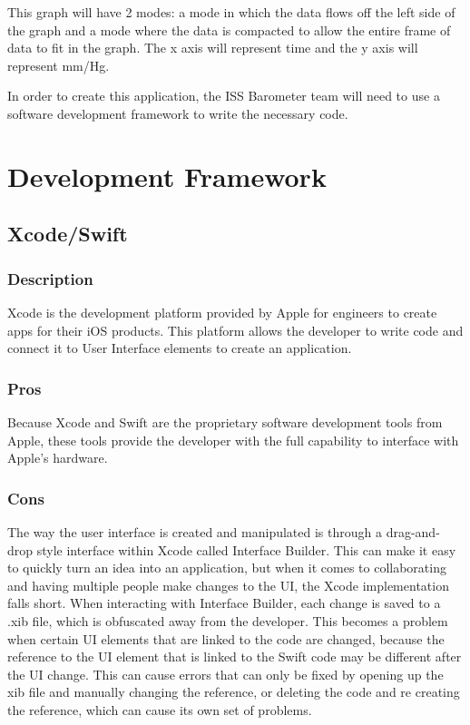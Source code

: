 \documentclass[onecolumn, draftclsnofoot,10pt, compsoc]{IEEEtran}
\begin{document}
This graph will have 2 modes: a mode in which the data flows off the left side of the graph and a mode where the data is compacted to allow the entire frame of data to fit in the graph. The x axis will represent time and the y axis will represent mm/Hg.

In order to create this application, the ISS Barometer team will need to use a software development framework to write the necessary code.

\section{Development Framework}

\subsection{Xcode/Swift}
\subsubsection*{Description}
Xcode is the development platform provided by Apple for engineers to create apps for their iOS products.
This platform allows the developer to write code and connect it to User Interface elements to create an application.

\subsubsection*{Pros}
Because Xcode and Swift are the proprietary software development tools from Apple, these tools provide the developer with the full capability to interface with Apple's hardware.

\subsubsection*{Cons}
The way the user interface is created and manipulated is through a drag-and-drop style interface within Xcode called Interface Builder.
This can make it easy to quickly turn an idea into an application, but when it comes to collaborating and having multiple people make changes to the UI, the Xcode implementation falls short.
When interacting with Interface Builder, each change is saved to a .xib file, which is obfuscated away from the developer.
This becomes a problem when certain UI elements that are linked to the code are changed, because the reference to the UI element that is linked to the Swift code may be different after the UI change.
This can cause errors that can only be fixed by opening up the xib file and manually changing the reference, or deleting the code and re creating the reference, which can cause its own set of problems.
\end{document}
